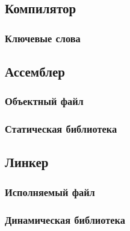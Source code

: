     \subsection{Компилятор}
    \subsubsection{Ключевые слова}
    \subsection{Ассемблер}
    \subsubsection{Объектный файл}
    \subsubsection{Статическая библиотека}
    \subsection{Линкер}
    \subsubsection{Исполняемый файл}
    \subsubsection{Динамическая библиотека}


